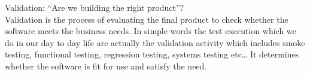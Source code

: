 Validation: “Are we building the right product”?\\
Validation is the process of evaluating the final product to check whether the software meets the business needs. In simple words the test execution which we do in our day to day life are actually the validation activity which includes smoke testing, functional testing, regression testing, systems testing etc… It determines whether the software is fit for use and satisfy the need.

\newpage